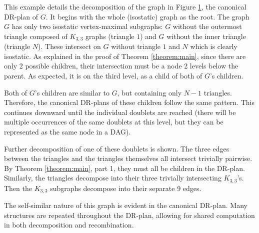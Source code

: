 \begin{figure}
{    }
    \label{fig:c2c3ofk33s}
\end{figure}%




\begin{example}
This example details the decomposition of the graph in Figure \ref{fig:c2c3ofk33s}, the canonical DR-plan of $G$. It begins with the whole (isostatic) graph as the root. The graph $G$ has only two isostatic vertex-maximal subgraphs: $G$ without the outermost triangle composed of $K_{3,3}$ graphs (triangle $1$) and $G$ without the inner triangle (triangle $N$). These intersect on $G$ without triangle $1$ and $N$ which is clearly isostatic. As explained in the proof of Theorem \ref{theorem:main}, since there are only 2 possible children, their intersection must be a node 2 levels below the parent. As expected, it is on the third level, as a child of both of $G$'s children.

Both of $G$'s children are similar to $G$, but containing only $N-1$ triangles. Therefore, the canonical DR-plans of these children follow the same pattern. This continues downward until the individual doublets are reached (there will be multiple occurrences of the same doublets at this level, but they can be represented as the same node in a DAG).

Further decomposition of one of these doublets is shown. The three edges between the triangles and the triangles themselves all intersect trivially pairwise. By Theorem \ref{theorem:main}, part 1, they must all be children in the DR-plan. Similarly, the triangles decompose into their three trivially intersecting $K_{3,3}$'s. Then the $K_{3,3}$ subgraphs decompose into their separate 9 edges.

The self-similar nature of this graph is evident in the canonical DR-plan. Many structures are repeated throughout the DR-plan, allowing for shared computation in both decomposition and recombination.
\end{example}





